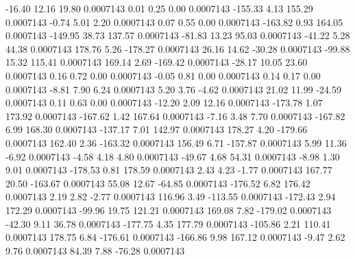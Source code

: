       -16.40       12.16       19.80     0.0007143
        0.01        0.25        0.00     0.0007143
     -155.33        4.13      155.29     0.0007143
       -0.74        5.01        2.20     0.0007143
        0.07        0.55        0.00     0.0007143
     -163.82        0.93      164.05     0.0007143
     -149.95       38.73      137.57     0.0007143
      -81.83       13.23       95.03     0.0007143
      -41.22        5.28       44.38     0.0007143
      178.76        5.26     -178.27     0.0007143
       26.16       14.62      -30.28     0.0007143
      -99.88       15.32      115.41     0.0007143
      169.14        2.69     -169.42     0.0007143
      -28.17       10.05       23.60     0.0007143
        0.16        0.72        0.00     0.0007143
       -0.05        0.81        0.00     0.0007143
        0.14        0.17        0.00     0.0007143
       -8.81        7.90        6.24     0.0007143
        5.20        3.76       -4.62     0.0007143
       21.02       11.99      -24.59     0.0007143
        0.11        0.63        0.00     0.0007143
      -12.20        2.09       12.16     0.0007143
     -173.78        1.07      173.92     0.0007143
     -167.62        1.42      167.64     0.0007143
       -7.16        3.48        7.70     0.0007143
     -167.82        6.99      168.30     0.0007143
     -137.17        7.01      142.97     0.0007143
      178.27        4.20     -179.66     0.0007143
      162.40        2.36     -163.32     0.0007143
      156.49        6.71     -157.87     0.0007143
        5.99       11.36       -6.92     0.0007143
       -4.58        4.18        4.80     0.0007143
      -49.67        4.68       54.31     0.0007143
       -8.98        1.30        9.01     0.0007143
     -178.53        0.81      178.59     0.0007143
        2.43        4.23       -1.77     0.0007143
      167.77       20.50     -163.67     0.0007143
       55.08       12.67      -64.85     0.0007143
     -176.52        6.82      176.42     0.0007143
        2.19        2.82       -2.77     0.0007143
      116.96        3.49     -113.55     0.0007143
     -172.43        2.94      172.29     0.0007143
      -99.96       19.75      121.21     0.0007143
      169.08        7.82     -179.02     0.0007143
      -42.30        9.11       36.78     0.0007143
     -177.75        4.35      177.79     0.0007143
     -105.86        2.21      110.41     0.0007143
      178.75        6.84     -176.61     0.0007143
     -166.86        9.98      167.12     0.0007143
       -9.47        2.62        9.76     0.0007143
       84.39        7.88      -76.28     0.0007143

